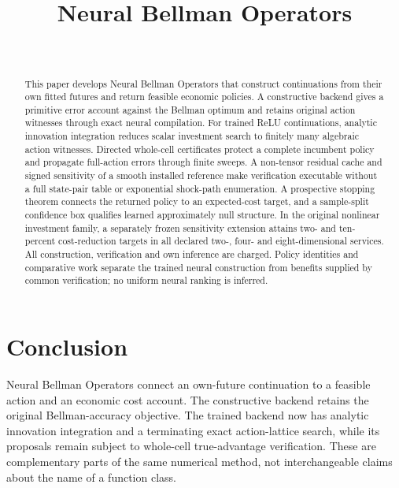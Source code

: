 \documentclass[ecta,nameyear,draft]{econsocart}
\begin{document}
\begin{frontmatter}
\title{Neural Bellman Operators}
\begin{aug}
\author[id=au1,addressref={add1}]{~}
\address[id=add1]{Peking University}
\end{aug}
\begin{abstract}
This paper develops Neural Bellman Operators that construct continuations from their own fitted futures and return feasible economic policies. A constructive backend gives a primitive error account against the Bellman optimum and retains original action witnesses through exact neural compilation. For trained ReLU continuations, analytic innovation integration reduces scalar investment search to finitely many algebraic action witnesses. Directed whole-cell certificates protect a complete incumbent policy and propagate full-action errors through finite sweeps. A non-tensor residual cache and signed sensitivity of a smooth installed reference make verification executable without a full state-pair table or exponential shock-path enumeration. A prospective stopping theorem connects the returned policy to an expected-cost target, and a sample-split confidence box qualifies learned approximately null structure. In the original nonlinear investment family, a separately frozen sensitivity extension attains two- and ten-percent cost-reduction targets in all declared two-, four- and eight-dimensional services. All construction, verification and own inference are charged. Policy identities and comparative work separate the trained neural construction from benefits supplied by common verification; no uniform neural ranking is inferred.
\end{abstract}
\begin{keyword}
\end{keyword}
\end{frontmatter}









\section{Conclusion}\label{sec:conclusion56}
Neural Bellman Operators connect an own-future continuation to a feasible action and an economic cost account. The constructive backend retains the original Bellman-accuracy objective. The trained backend now has analytic innovation integration and a terminating exact action-lattice search, while its proposals remain subject to whole-cell true-advantage verification. These are complementary parts of the same numerical method, not interchangeable claims about the name of a function class.
\end{document}
